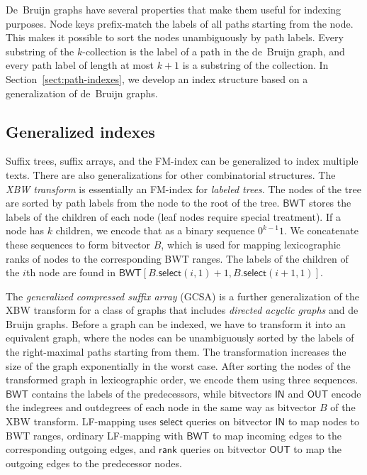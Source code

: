 \documentclass[a4paper,11pt]{llncs}
\newcommand{\rank}{\ensuremath{\mathsf{rank}}}
\newcommand{\select}{\ensuremath{\mathsf{select}}}
\newcommand{\kcollection}[1]{$#1$\nobreakdash-collection}
\newcommand{\LFmapping}{LF\nobreakdash-mapping}
\newcommand{\FMindex}{FM\nobreakdash-index}
\newcommand{\BWT}{\ensuremath{\mathsf{BWT}}}
\newcommand{\bvIN}{\ensuremath{\mathsf{IN}}}
\newcommand{\bvOUT}{\ensuremath{\mathsf{OUT}}}
\begin{document}
De~Bruijn graphs have several properties that make them useful for indexing purposes. Node keys prefix-match the labels of all paths starting from the node. This makes it possible to sort the nodes unambiguously by path labels. Every substring of the \kcollection{k} is the label of a path in the de~Bruijn graph, and every path label of length at most $k+1$ is a substring of the collection. In Section~\ref{sect:path-indexes}, we develop an index structure based on a generalization of de~Bruijn graphs.

\subsection{Generalized indexes}

Suffix trees, suffix arrays, and the \FMindex{} can be generalized to index multiple texts. There are also generalizations for other combinatorial structures. The \emph{XBW transform} \cite{Ferragina2009b} is essentially an \FMindex{} for \emph{labeled trees}. The nodes of the tree are sorted by path labels from the node to the root of the tree. $\BWT$ stores the labels of the children of each node (leaf nodes require special treatment). If a node has $k$ children, we encode that as a binary sequence $0^{k-1} 1$. We concatenate these sequences to form bitvector $B$, which is used for mapping lexicographic ranks of nodes to the corresponding BWT ranges. The labels of the children of the $i$th node are found in $\BWT[B.\select(i, 1) + 1, B.\select(i + 1, 1)]$.

The \emph{generalized compressed suffix array} (GCSA) \cite{Siren2014} is a further generalization of the XBW transform for a class of graphs that includes \emph{directed acyclic graphs} and de Bruijn graphs. Before a graph can be indexed, we have to transform it into an equivalent graph, where the nodes can be unambiguously sorted by the labels of the right-maximal paths starting from them. The transformation increases the size of the graph exponentially in the worst case. After sorting the nodes of the transformed graph in lexicographic order, we encode them using three sequences. $\BWT$ contains the labels of the predecessors, while bitvectors $\bvIN$ and $\bvOUT$ encode the indegrees and outdegrees of each node in the same way as bitvector $B$ of the XBW transform. \LFmapping{} uses $\select$ queries on bitvector $\bvIN$ to map nodes to BWT ranges, ordinary \LFmapping{} with $\BWT$ to map incoming edges to the corresponding outgoing edges, and $\rank$ queries on bitvector $\bvOUT$ to map the outgoing edges to the predecessor nodes.
\end{document}
